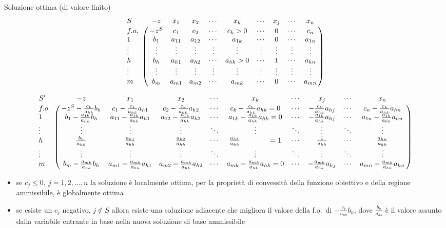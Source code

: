 \documentclass{beamer}
\begin{document}
\begin{frame}[allowframebreaks]{Soluzione ottima (di valore finito)}
{\small
\[
\bordermatrix{
   S    &  -z   & x_{1}    &  x_{2}	&\cdots& x_{k}       &\cdots& x_{j}&\cdots&x_{n} \cr
   f.o.\   &  -z^S      &  c_1       & c_2         & \cdots&c_k>0      &\cdots&     0      &\cdots&c_{n} \cr
	1    &  b_{1}& a_{11} & a_{12}    & \cdots&a_{1k}    &\cdots&     0      &\cdots&a_{1n} \cr
\vdots & \vdots &\vdots &\vdots &\vdots &\vdots &\vdots &\vdots &\vdots &\vdots \cr
	h    &  b_{h}& a_{h1} & a_{h2}    & \cdots&a_{hk}>0&\cdots&     1      &\cdots&a_{hn} \cr
\vdots & \vdots &\vdots &\vdots &\vdots &\vdots &\vdots &\vdots &\vdots &\vdots \cr
	m    &  b_{m}& a_{m1} & a_{m2}    & \cdots&a_{mk}&\cdots&     0      &\cdots&a_{mn} \cr
}
\]
}

{\tiny 
\[
\bordermatrix{
   S^\prime     &  -z    & x_{1}    &  x_{2}	&\cdots& x_{k}       &\cdots& x_{j}&\cdots&x_{n} \cr
   f.o.\   &  -z^S-\frac{c_k}{a_{hk}}b_{h}      & c_1-\frac{c_k}{a_{hk}}a_{h1}       & c_2-\frac{c_k}{a_{hk}}a_{h2}         & \cdots&c_k-\frac{c_k}{a_{hk}}a_{hk}=0      &\cdots&     -\frac{c_k}{a_{hk}}a_{hj}      &\cdots&c_{n}-\frac{c_k}{a_{hk}}a_{hn} \cr
	1    &  b_{1}-\frac{a_{1k}}{a_{hk}}b_h& a_{11}-\frac{a_{1k}}{a_{hk}}a_{h1} & a_{12}-\frac{a_{1k}}{a_{hk}}a_{h2} & \cdots&a_{1k}-\frac{a_{1k}}{a_{hk}}a_{hk}=0 &\cdots& -\frac{a_{1k}}{a_{hk}}a_{hj} &\cdots&a_{1n}-\frac{a_{1k}}{a_{hk}}a_{hn} \cr
\vdots & \vdots &\vdots &\vdots &\ddots &\vdots &\ddots &\vdots &\ddots &\vdots \cr
	h    &\frac{b_{h}}{a_{hk}}&\frac{a_{h1}}{a_{hk}} &\frac{a_{h2}}{a_{hk}}    & \cdots&\frac{a_{hk}}{a_{hk}}\phantom{-\frac{a_{mk}}{a_{hk}}a_{hj}}=1&\cdots&\frac{1}{a_{hk}}      &\cdots&\frac{a_{hn}}{a_{hk}} \cr	
\vdots & \vdots &\vdots &\vdots &\ddots &\vdots &\ddots &\vdots &\ddots &\vdots \cr
	m    &  b_{m}-\frac{a_{mk}}{a_{hk}}b_h& a_{m1}-\frac{a_{mk}}{a_{hk}}a_{h1} & a_{m2}-\frac{a_{mk}}{a_{hk}}a_{h2} & \cdots&a_{mk}-\frac{a_{mk}}{a_{hk}}a_{hk}=0&\cdots&     -\frac{a_{mk}}{a_{hk}}a_{hj}      &\cdots&a_{mn}-\frac{a_{mk}}{a_{hk}}a_{hn} \cr
}
\]
}

\begin{itemize}
\item se $c_j \leq 0,\ j=1,2,\ldots,n$ la soluzione \`e
	localmente ottima, per la propriet\`a di
	convessit\`a della funzione obiettivo e della regione
	ammissibile, \`e globalmente ottima
\item se esiste un $c_j$ negativo, $j \notin S$ allora esiste
	una soluzione adiacente che migliora il valore della f.o.\ di
	$-\frac{c_k}{a_{hk}}b_{h}$, dove $\frac{b_{h}}{a_{hk}}$ \`e
	il valore assunto dalla variabile entrante in base nella
	nuova soluzione di base ammissibile
\end{itemize}
\end{frame}
\end{document}
